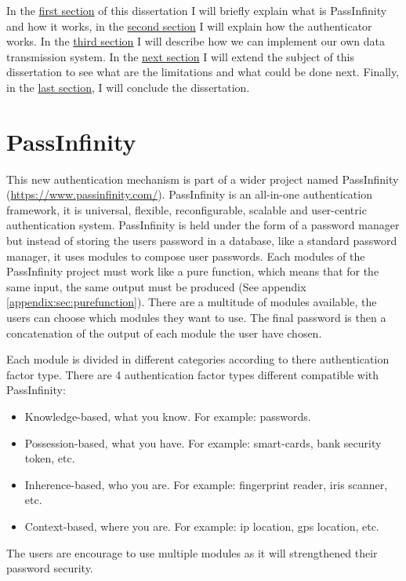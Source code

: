 \documentclass[twocolumn,14pt]{extarticle}
\begin{document}
In the \hyperref[sec:passinfinity]{first section} of this dissertation I will briefly explain what is PassInfinity and how it works, in the \hyperref[sec:audiotoken]{second section} I will explain how the authenticator works. In the \hyperref[sec:implementation]{third section} I will describe how we can implement our own data transmission system. In the \hyperref[sec:limitationsfurtherwork]{next section} I will extend the subject of this dissertation to see what are the limitations and what could be done next. Finally, in the \hyperref[sec:conclusion]{last section}, I will conclude the dissertation.

\section{PassInfinity}
\label{sec:passinfinity}
This new authentication mechanism is part of a wider project named PassInfinity (\href{https://www.passinfinity.com/}{https://www.passinfinity.com/}). PassInfinity is an all-in-one authentication framework, it is universal, flexible, reconfigurable, scalable and user-centric authentication system. PassInfinity is held under the form of a password manager but instead of storing the users password in a database, like a standard password manager, it uses modules to compose user passwords. Each modules of the PassInfinity project must work like a pure function, which means that for the same input, the same output must be produced (See appendix \ref{appendix:sec:purefunction}). There are a multitude of modules available, the users can choose which modules they want to use. The final password is then a concatenation of the output of each module the user have chosen.

Each module is divided in different categories according to there authentication factor type. There are 4 authentication factor types different compatible with PassInfinity:
\begin{itemize}
\item Knowledge-based, what you know. For example: passwords.
\item Possession-based, what you have. For example: smart-cards, bank security token, etc.
\item Inherence-based, who you are. For example: fingerprint reader, iris scanner, etc.
\item Context-based, where you are. For example: ip location, gps location, etc.
\end{itemize}
The users are encourage to use multiple modules as it will strengthened their password security. 
\end{document}
